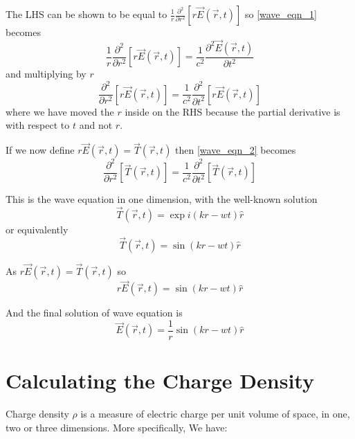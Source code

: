    The LHS can be shown to be equal to $\frac{1}{r}\frac{\partial^2}{\partial r^2}[r\vec{E}(\vec{r},t)]$ so \eqref{wave_eqn_1} becomes
%
   \begin{equation}
   \frac{1}{r}\frac{\partial^2}{\partial r^2}[r\vec{E}(\vec{r},t)] = \frac{1}{c^2}\frac{\partial^2\vec{E}(\vec{r},t)}{\partial t^2} 
   \end{equation}
%
and multiplying by $r$
%
   \begin{equation}\label{wave_eqn_2}
   \frac{\partial^2}{\partial r^2}[r\vec{E}(\vec{r},t)] = \frac{1}{c^2}\frac{\partial^2}{\partial t^2}[r\vec{E}(\vec{r},t)]
   \end{equation}
%
where we have moved the $r$ inside on the RHS because the partial derivative is with respect to $t$ and not $r$.

If we now define $r\vec{E}(\vec{r},t) = \vec{T}(\vec{r},t)$ then \eqref{wave_eqn_2} becomes
%
   \begin{equation}
   \frac{\partial^2}{\partial r^2}[\vec{T}(\vec{r},t)] = \frac{1}{c^2}\frac{\partial^2}{\partial t^2}[\vec{T}(\vec{r},t)]
   \end{equation}

This is the wave equation in one dimension, with the well-known solution
%
\begin{equation}
\vec{T}(\vec{r},t) = \exp{i(kr-wt)}\hat{r}
\end{equation}
%
or equivalently
%
\begin{equation}
   \vec{T}(\vec{r},t) = \sin(kr-wt) \hat{r}
\end{equation}

As $r \vec{E}(\vec{r},t) = \vec{T}(\vec{r},t)$ so
%
   \begin{equation}
      r\vec{E}(\vec{r},t) = \sin(kr-wt) \hat{r}
   \end{equation}

And the final solution of wave equation is
%
\begin{equation}\label{eqn_E_final}
   \vec{E}(\vec{r},t) = \frac{1}{r}\sin(kr-wt) \hat{r}
\end{equation}



\section{Calculating the Charge Density}

Charge density $\rho$ is a measure of electric charge per unit volume of space, in one, two or three dimensions. More specifically, We have:

